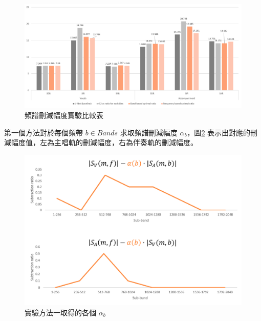 \begin{figure}[htbp]
    \hfil
    \begin{minipage}[t]{1.0\textwidth}
        \includegraphics[width=\textwidth]{./figures/chapter05_result/magnitude_subtraction_method_result1.png}
        \caption {頻譜刪減幅度實驗比較表}
        \label{magnitude_subtraction_method_result1}
    \end{minipage}
    \hfil
\end{figure}

第一個方法對於每個頻帶 $b\in Bands$ 求取頻譜刪減幅度 $\alpha_b$，圖\ref{magnitude_subtraction_method_result2} 表示出對應的刪減幅度值，左為主唱軌的刪減幅度，右為伴奏軌的刪減幅度。

\begin{figure}[htbp]
    \hfil
    \begin{minipage}[t]{0.6\textwidth}
        \includegraphics[width=\textwidth]{./figures/chapter05_result/magnitude_subtraction_method_result2.png}
        \caption {實驗方法一取得的各個 $\alpha_b$}
        \label{magnitude_subtraction_method_result2}
    \end{minipage}
    \hfil
\end{figure}


